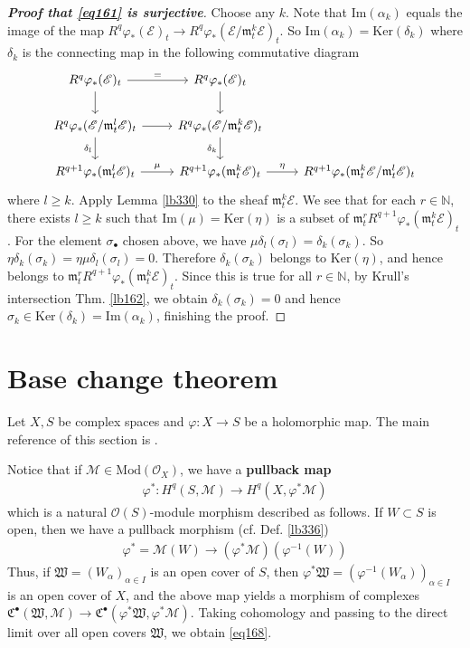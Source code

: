 \documentclass[12pt,b5paper,notitlepage]{report}
\theoremstyle{definition}
\theoremstyle{plain}
\newcommand{\fk}{\mathfrak}
\newcommand{\scr}{\mathscr}
\newcommand{\blt}{\bullet}
\newcommand{\Nbb}{\mathbb N}
\newcommand{\Ker}{\mathrm{Ker}}
\newcommand{\Imag}{\mathrm{Im}}
\newcommand{\Mod}{\mathrm{Mod}}
\newcommand{\mk}{\mathfrak m}
\numberwithin{equation}{section}
\begin{document}
\begin{proof}[\textbf{Proof that \eqref{eq161} is surjective}]
Choose any $k$. Note that $\Imag(\alpha_k)$ equals the image of the map $R^q\varphi_*(\scr E)_t\rightarrow R^q\varphi_*(\scr E/\mk_t^k\scr E)_t$. So $\Imag(\alpha_k)=\Ker(\delta_k)$ where $\delta_k$ is the connecting map in the following commutative diagram
\begin{equation*}
\begin{tikzcd}
R^q\varphi_*(\scr E)_t \arrow[r,"="] \arrow[d]  & R^q\varphi_*(\scr E)_t \arrow[d]  &   \\
R^q\varphi_*(\scr E/\mk_t^l\scr E)_t \arrow[r] \arrow[d,"\delta_l"'] & R^q\varphi_*(\scr E/\mk_t^k\scr E)_t \arrow[d,"\delta_k"'] &   \\
R^{q+1}\varphi_*(\mk_t^l\scr E)_t \arrow[r,"\mu"]           & R^{q+1}\varphi_*(\mk_t^k\scr E)_t \arrow[r,"\eta"] & R^{q+1}\varphi_*(\mk_t^k\scr E/\mk_t^l\scr E)_t
\end{tikzcd}
\end{equation*}
where $l\geq k$. Apply Lemma \ref{lb330} to the sheaf $\mk_t^k\scr E$. We see that for each $r\in\Nbb$, there exists $l\geq k$  such that $\Imag(\mu)=\Ker(\eta)$ is a subset of $\mk_t^r R^{q+1}\varphi_*(\mk_t^k\scr E)_t$. For the element $\sigma_\blt$ chosen above, we have $\mu\delta_l(\sigma_l)=\delta_k(\sigma_k)$. So $\eta\delta_k(\sigma_k)=\eta\mu\delta_l(\sigma_l)=0$. Therefore $\delta_k(\sigma_k)$ belongs to $\Ker(\eta)$, and hence belongs to $\mk_t^r R^{q+1}\varphi_*(\mk_t^k\scr E)_t$. Since this is true for all $r\in\Nbb$, by Krull's intersection Thm. \ref{lb162}, we obtain $\delta_k(\sigma_k)=0$ and hence $\sigma_k\in\Ker(\delta_k)=\Imag(\alpha_k)$, finishing the proof.
\end{proof}



\section{Base change theorem}\label{lb357}


Let $X,S$ be complex spaces and $\varphi:X\rightarrow S$ be a holomorphic map. The main reference of this section is \cite[Sec. III.3]{BS}.

Notice that if $\scr M\in\Mod(\scr O_X)$, we have a \textbf{pullback map} 
\begin{align}
\varphi^*:H^q(S,\scr M)\rightarrow H^q(X,\varphi^*\scr M)   \label{eq168}
\end{align}
which is a natural $\scr O(S)$-module morphism described as follows. If $W\subset S$ is open, then we have a pullback morphism (cf. Def. \ref{lb336})
\begin{align*}
\varphi^*=\scr M(W)\rightarrow(\varphi^*\scr M)(\varphi^{-1}(W))
\end{align*}
Thus, if $\fk W=(W_\alpha)_{\alpha\in I}$ is an open cover of $S$, then $\varphi^*\fk W=(\varphi^{-1}(W_\alpha))_{\alpha\in I}$ is an open cover of $X$, and the above map yields a morphism of complexes $\fk C^\blt(\fk W,\scr M)\rightarrow \fk C^\blt(\varphi^*\fk W,\varphi^*\scr M)$. Taking cohomology and passing to the direct limit over all open covers $\fk W$, we obtain \eqref{eq168}.
\end{document}
